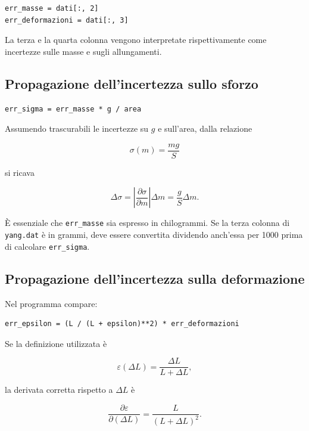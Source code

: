 \documentclass[11pt,a4paper]{book}
\begin{document}
\begin{lstlisting}
err_masse = dati[:, 2]
err_deformazioni = dati[:, 3]
\end{lstlisting}

La terza e la quarta colonna vengono interpretate rispettivamente come incertezze sulle masse e sugli allungamenti.

\subsection{Propagazione dell'incertezza sullo sforzo}

\begin{lstlisting}
err_sigma = err_masse * g / area
\end{lstlisting}

Assumendo trascurabili le incertezze su $g$ e sull'area, dalla relazione

\begin{equation}
    \sigma(m)=\frac{mg}{S}
\end{equation}

si ricava

\begin{equation}
    \Delta\sigma=
    \left|\frac{\partial\sigma}{\partial m}\right|\Delta m
    =\frac{g}{S}\Delta m.
\end{equation}

È essenziale che \texttt{err\_masse} sia espresso in chilogrammi. Se la terza colonna di \texttt{yang.dat} è in grammi, deve essere convertita dividendo anch'essa per 1000 prima di calcolare \texttt{err\_sigma}.

\subsection{Propagazione dell'incertezza sulla deformazione}

Nel programma compare:

\begin{lstlisting}
err_epsilon = (L / (L + epsilon)**2) * err_deformazioni
\end{lstlisting}

Se la definizione utilizzata è

\begin{equation}
    \varepsilon(\Delta L)=\frac{\Delta L}{L+\Delta L},
\end{equation}

la derivata corretta rispetto a $\Delta L$ è

\begin{equation}
    \frac{\partial\varepsilon}{\partial(\Delta L)}
    =\frac{L}{(L+\Delta L)^2}.
\end{equation}
\end{document}
